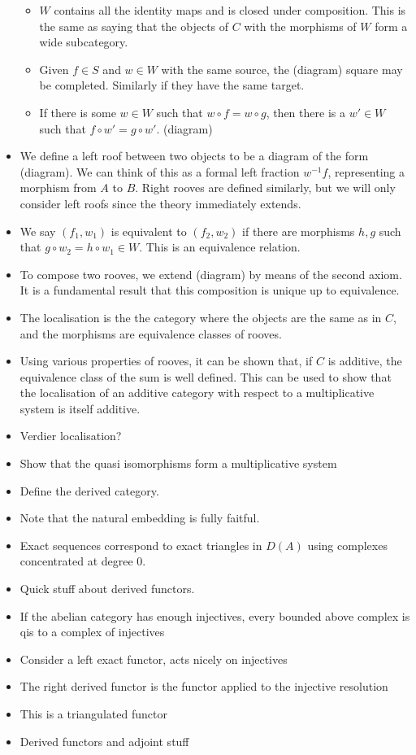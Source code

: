 \documentclass[a4paper]{article}
\begin{document}
\begin{itemize}
\begin{itemize}
            \item $W$ contains all the identity maps and is closed under composition. This is the same as saying that the objects of $C$ with the morphisms of $W$ form a wide subcategory.
            \item Given $f\in S$ and $w\in W$ with the same source, the (diagram) square may be completed. Similarly if they have the same target.
            \item If there is some $w\in W$ such that $w\circ f = w \circ g$, then there is a $w' \in W$ such that $f \circ w' = g \circ w'$. (diagram)
        \end{itemize}
    \item We define a left roof between two objects to be a diagram of the form (diagram). We can think of this as a formal left fraction $w^{-1}f$, representing a morphism from $A$ to $B$. Right rooves are defined similarly, but we will only consider left roofs since the theory immediately extends.
    \item We say $(f_1, w_1)$ is equivalent to $(f_2, w_2)$ if there are morphisms $h,g$ such that $g\circ w_2 = h\circ w_1 \in W$. This is an equivalence relation.
    \item To compose two rooves, we extend (diagram) by means of the second axiom. It is a fundamental result that this composition is unique up to equivalence.
    \item The localisation is the the category where the objects are the same as in $C$, and the morphisms are equivalence classes of rooves.
    \item Using various properties of rooves, it can be shown that, if $C$ is additive, the equivalence class of the sum is well defined. This can be used to show that the localisation of an additive category with respect to a multiplicative system is itself additive.
    \item Verdier localisation?
    \item Show that the quasi isomorphisms form a multiplicative system
    \item Define the derived category.
    \item Note that the natural embedding is fully faitful.
    \item Exact sequences correspond to exact triangles in $D(A)$ using complexes concentrated at degree $0$.
    \item Quick stuff about derived functors.
    \item If the abelian category has enough injectives, every bounded above complex is qis to a complex of injectives
    \item Consider a left exact functor, acts nicely on injectives
    \item The right derived functor is the functor applied to the injective resolution
    \item This is a triangulated functor
    \item Derived functors and adjoint stuff
\end{itemize}
\end{document}
